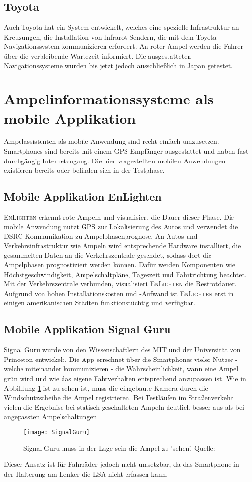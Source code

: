 \subsection*{Toyota}
Auch Toyota hat ein System entwickelt, welches eine spezielle Infrastruktur an Kreuzungen, die Installation von Infrarot-Sendern, die mit dem Toyota-Navigationssystem kommunizieren erfordert. An roter Ampel werden die Fahrer über die verbleibende Wartezeit informiert. Die ausgestatteten Navigationssysteme wurden bis jetzt jedoch ausschließlich in Japan getestet. \cite{Toyota}
%
%
\section{Ampelinformationssysteme als mobile Applikation}
Ampelassistenten als mobile Anwendung sind recht einfach umzusetzen. Smartphones sind bereits mit einem \gls{GPS}-Empfänger ausgestattet und haben fast durchgängig Internetzugang. Die hier vorgestellten mobilen Anwendungen existieren bereits oder befinden sich in der Testphase.
\subsection*{Mobile Applikation EnLighten}
\textsc{EnLighten} erkennt rote Ampeln und visualisiert die Dauer dieser Phase. Die mobile Anwendung nutzt \gls{GPS} zur Lokalisierung des Autos und verwendet die \gls{DSRC}-Kommunikation zu Ampelphasenprognose. An Autos und Verkehrsinfrastruktur wie Ampeln wird entsprechende Hardware installiert, die gesammelten Daten an die Verkehrszentrale gesendet, sodass dort die Ampelphasen prognostiziert werden können. Dafür werden Komponenten wie Höchstgeschwindigkeit, Ampelschaltpläne, Tageszeit und Fahrtrichtung beachtet. Mit der Verkehrszentrale verbunden, visualisiert \textsc{EnLighten} die Restrotdauer.\\ Aufgrund von hohen Installationskosten und -Aufwand ist \textsc{EnLighten} erst in einigen amerikanischen Städten funktionstüchtig und verfügbar.
\subsection*{Mobile Applikation Signal Guru}
Signal Guru wurde von den Wissenschaftlern des \gls{MIT} und der Universität von Princeton entwickelt. Die App errechnet über die Smartphones vieler Nutzer - welche miteinander kommunizieren -  die Wahrscheinlichkeit, wann eine Ampel grün wird und wie das eigene Fahrverhalten entsprechend anzupassen ist. Wie in Abbildung \ref{fig:AppSignalGuru} ist zu sehen ist, muss die eingebaute Kamera durch die Windschutzscheibe die Ampel registrieren. Bei Testläufen im Straßenverkehr vielen die Ergebnise bei statisch geschalteten Ampeln deutlich besser aus als bei angepassten Ampelschaltungen \cite{SignalGuruPaper} 
\begin{figure}[H]
    \centering
    \texttt{[image: SignalGuru]}
    \caption[Signal Guru]{Signal Guru muss in der Lage sein die Ampel zu 'sehen'.  Quelle: \cite{SignalGuruPaper}} \label{fig:AppSignalGuru}
\end{figure}
Dieser Ansatz ist für Fahrräder jedoch nicht umsetzbar, da das Smartphone in der Halterung am Lenker die \gls{LSA} nicht erfassen kann.
